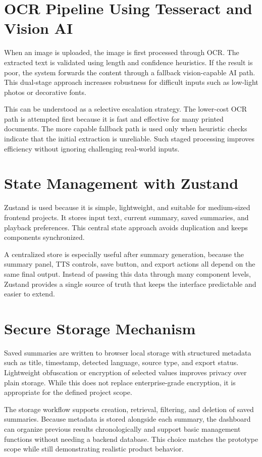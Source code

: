 \documentclass[12pt, a4paper]{report}
\begin{document}
\section{OCR Pipeline Using Tesseract and Vision AI}
When an image is uploaded, the image is first processed through OCR. The extracted text is validated using length and confidence heuristics. If the result is poor, the system forwards the content through a fallback vision-capable AI path. This dual-stage approach increases robustness for difficult inputs such as low-light photos or decorative fonts.

This can be understood as a selective escalation strategy. The lower-cost OCR path is attempted first because it is fast and effective for many printed documents. The more capable fallback path is used only when heuristic checks indicate that the initial extraction is unreliable. Such staged processing improves efficiency without ignoring challenging real-world inputs.

\section{State Management with Zustand}
Zustand is used because it is simple, lightweight, and suitable for medium-sized frontend projects. It stores input text, current summary, saved summaries, and playback preferences. This central state approach avoids duplication and keeps components synchronized.

A centralized store is especially useful after summary generation, because the summary panel, TTS controls, save button, and export actions all depend on the same final output. Instead of passing this data through many component levels, Zustand provides a single source of truth that keeps the interface predictable and easier to extend.

\section{Secure Storage Mechanism}
Saved summaries are written to browser local storage with structured metadata such as title, timestamp, detected language, source type, and export status. Lightweight obfuscation or encryption of selected values improves privacy over plain storage. While this does not replace enterprise-grade encryption, it is appropriate for the defined project scope.

The storage workflow supports creation, retrieval, filtering, and deletion of saved summaries. Because metadata is stored alongside each summary, the dashboard can organize previous results chronologically and support basic management functions without needing a backend database. This choice matches the prototype scope while still demonstrating realistic product behavior.
\end{document}
